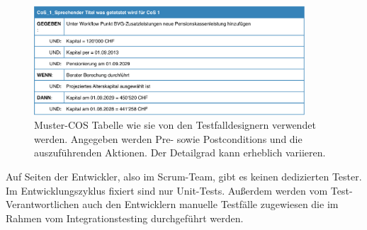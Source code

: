 \begin{figure}[h] 
  \centering
     \includegraphics[width=0.9\textwidth]{figures/cos_raiffeisen.png}
  \caption{Muster-COS Tabelle wie sie von den Testfalldesignern verwendet werden.  Angegeben werden Pre- sowie Postconditions und die auszuführenden Aktionen. Der Detailgrad kann erheblich variieren.}
  \label{fig:cos_raiffeisen}
\end{figure}


Auf Seiten der Entwickler, also im Scrum-Team, gibt es keinen dedizierten Tester. Im Entwicklungszyklus fixiert sind nur Unit-Tests. Außerdem werden vom Test-Verantwortlichen auch den Entwicklern manuelle Testfälle zugewiesen die im Rahmen vom Integrationstesting  durchgeführt werden.

